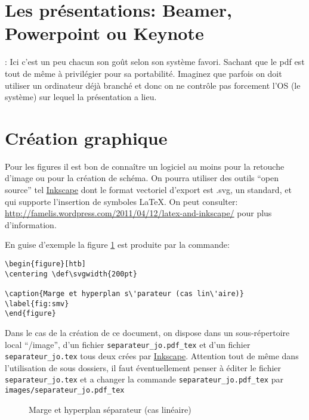 
\section{Les présentations: Beamer, Powerpoint ou Keynote}

: Ici c'est un peu chacun son goût selon son système favori. 
Sachant que le pdf est tout de même \`a privilégier
pour sa portabilité. Imaginez que parfois on doit utiliser un ordinateur
déjà branché et donc on ne contrôle pas forcement l'OS (le système) sur lequel la présentation
a lieu.

\section{Cr\'eation graphique}
Pour les figures il est bon de connaître un
logiciel au moins pour la retouche d'image ou pour la création de schéma.
On pourra utiliser des outils ``open source'' tel  \href{http://inkscape.org/}{Inkscape}
 dont le format vectoriel d'export est .svg, un standard, et qui supporte l'insertion de symboles \LaTeX. 
 On peut consulter: \url{http://famelis.wordpress.com/2011/04/12/latex-and-inkscape/}
pour plus d'information.

En guise d'exemple la figure \ref{fig:smv} est produite par la commande:
\begin{lstlisting}
\begin{figure}[htb] 
\centering \def\svgwidth{200pt} 
 
\caption{Marge et hyperplan s\'parateur (cas lin\'aire)} 
\label{fig:smv}
\end{figure}
\end{lstlisting}
Dans le cas de la création de ce document, on dispose dans un sous-répertoire local ``/image'',
d'un fichier \lstinline+separateur_jo.pdf_tex+ et d'un fichier \lstinline+separateur_jo.tex+
tous deux crées par \href{http://inkscape.org/}{Inkscape}.
Attention tout de m\^eme dans l'utilisation de sous dossiers,
il faut éventuellement penser \`a éditer le fichier
\lstinline+separateur_jo.tex+
et a changer la commande \lstinline+separateur_jo.pdf_tex+
par \lstinline+images/separateur_jo.pdf_tex+


\begin{figure}[htb] 
\centering \def\svgwidth{400pt} 
 
\caption{Marge et hyperplan séparateur (cas linéaire)} 
\label{fig:smv}
\end{figure}



